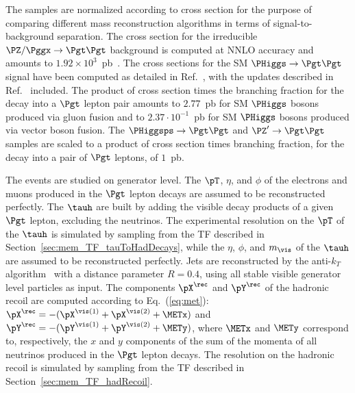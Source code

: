 The samples are normalized according to cross section for the purpose of comparing different mass reconstruction algorithms in terms of signal-to-background separation.
The cross section for the irreducible $\PZ/\Pggx \to \Pgt\Pgt$ background is computed at NNLO accuracy and amounts to $1.92 \times 10^{3}$~pb~\cite{FEWZ}.
The cross sections for the SM $\PHiggs \to \Pgt\Pgt$ signal have been computed as detailed in Ref.~\cite{Dittmaier:2011ti},
with the updates described in Ref.~\cite{Heinemeyer:2013tqa} included.
The product of cross section times the branching fraction for the decay into a $\Pgt$ lepton pair
amounts to $2.77$~pb for SM $\PHiggs$ bosons produced via gluon fusion 
and to $2.37 \cdot 10^{-1}$~pb for SM $\PHiggs$ bosons produced via vector boson fusion.
The $\PHiggsps \to \Pgt\Pgt$ and $\PZ' \to \Pgt\Pgt$ samples 
are scaled to a product of cross section times branching fraction, for the decay into a pair of $\Pgt$ leptons, of $1$~pb.

The events are studied on generator level.
The $\pT$, $\eta$, and $\phi$ of the electrons and muons produced in the $\Pgt$ lepton decays
are assumed to be reconstructed perfectly.
The $\tauh$ are built by adding the visible decay products of a given $\Pgt$ lepton, excluding the neutrinos.
The experimental resolution on the $\pT$ of the $\tauh$ is simulated by sampling from the TF described in Section~\ref{sec:mem_TF_tauToHadDecays},
while the $\eta$, $\phi$, and $m_{\vis}$ of the $\tauh$ are assumed to be reconstructed perfectly.
Jets are reconstructed by the anti-$k_{T}$ algorithm~\cite{AntiKT} with a distance parameter $R = 0.4$,
using all stable visible generator level particles as input.
The components $\pX^{\rec}$ and $\pY^{\rec}$ of the hadronic recoil are computed according to Eq.~(\ref{eq:met}):
$\pX^{\rec} = -( \pX^{\vis(1)} + \pX^{\vis(2)} + \METx )$
and
$\pY^{\rec} = -( \pY^{\vis(1)} + \pY^{\vis(2)} + \METy )$,
where $\METx$ and $\METy$ correspond to, respectively, the $x$ and $y$ components of the sum of the momenta of all neutrinos produced in the $\Pgt$ lepton decays.
The resolution on the hadronic recoil is simulated by sampling from the TF described in Section~\ref{sec:mem_TF_hadRecoil}.

